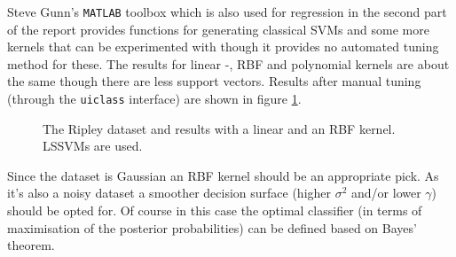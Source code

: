 \par Steve Gunn's \texttt{MATLAB} toolbox which is also used for regression in the second part of the report provides functions for generating classical SVMs and some more kernels that can be experimented with though it provides no automated tuning method for these. The results for linear -, RBF and polynomial kernels are about the same though there are less support vectors. Results after manual tuning (through the \texttt{uiclass} interface) are shown in figure \ref{ripleysvm}.

\begin{figure}[htp]
\centering
{}\hfil
{}\hfil
{}\hfil
\caption{The Ripley dataset and results with a linear and an RBF kernel. LSSVMs are used.}
\label{ripleysvm}
\end{figure}

Since the dataset is Gaussian an RBF kernel should be an appropriate pick. As it's also a noisy dataset a smoother decision surface (higher $\sigma^2$ and/or lower $\gamma$) should be opted for. Of course in this case the optimal classifier (in terms of maximisation of the posterior probabilities) can be defined based on Bayes' theorem.

